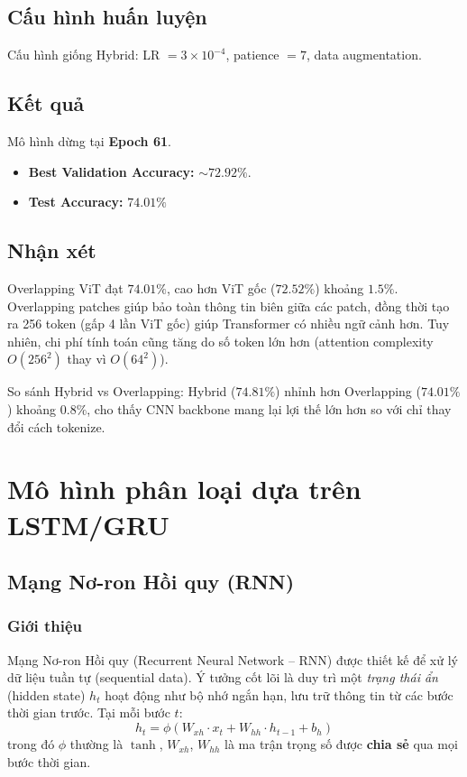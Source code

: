 \documentclass[a4paper]{article}
\theoremstyle{definition}
\begin{document}
\subsection{Cấu hình huấn luyện}
Cấu hình giống Hybrid: LR $= 3 \times 10^{-4}$, patience $= 7$, data augmentation.

\subsection{Kết quả}

Mô hình dừng tại \textbf{Epoch 61}.

\begin{itemize}
	\item \textbf{Best Validation Accuracy:} $\sim 72.92\%$.
	\item \textbf{Test Accuracy:} $\mathbf{74.01\%}$
\end{itemize}

\subsection{Nhận xét}
Overlapping ViT đạt $74.01\%$, cao hơn ViT gốc ($72.52\%$) khoảng $1.5\%$. Overlapping patches giúp bảo toàn thông tin biên giữa các patch, đồng thời tạo ra 256 token (gấp 4 lần ViT gốc) giúp Transformer có nhiều ngữ cảnh hơn. Tuy nhiên, chi phí tính toán cũng tăng do số token lớn hơn (attention complexity $O(256^2)$ thay vì $O(64^2)$).

So sánh Hybrid vs Overlapping: Hybrid ($74.81\%$) nhỉnh hơn Overlapping ($74.01\%$) khoảng $0.8\%$, cho thấy CNN backbone mang lại lợi thế lớn hơn so với chỉ thay đổi cách tokenize.

\section{Mô hình phân loại dựa trên LSTM/GRU}

\subsection{Mạng Nơ-ron Hồi quy (RNN)}

\subsubsection{Giới thiệu}
Mạng Nơ-ron Hồi quy (Recurrent Neural Network -- RNN) được thiết kế để xử lý dữ liệu tuần tự (sequential data). Ý tưởng cốt lõi là duy trì một \textit{trạng thái ẩn} (hidden state) $h_t$ hoạt động như bộ nhớ ngắn hạn, lưu trữ thông tin từ các bước thời gian trước. Tại mỗi bước $t$:
\begin{equation}
	h_t = \phi\left(W_{xh} \cdot x_t + W_{hh} \cdot h_{t-1} + b_h\right)
	\label{eq:rnn-hidden}
\end{equation}
trong đó $\phi$ thường là $\tanh$, $W_{xh}$, $W_{hh}$ là ma trận trọng số được \textbf{chia sẻ} qua mọi bước thời gian.
\end{document}
